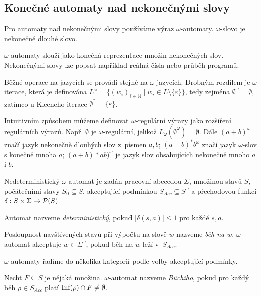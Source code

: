 \subsection{Konečné automaty nad nekonečnými slovy}


Pro automaty nad nekonečnými slovy používáme výraz $\omega$-automaty.
$\omega$-slovo je nekonečně dlouhé slovo.

$\omega$-automaty slouží jako konečná reprezentace množin nekonečných
slov. Nekonečnými slovy lze popsat například reálná čísla nebo průběh
programů.

Běžné operace na jazycích se provádí stejně na $\omega$-jazycích.
Drobným rozdílem je $\omega$ iterace, která je definována
$L^\omega = \{ (w_i)_{i \in \mathbb{N}} \mid w_i \in L \setminus \{ \varepsilon \} \}$,
tedy zejména
$\emptyset^\omega = \emptyset$, zatímco u Kleeneho iterace
$\emptyset^* = \{ \varepsilon \}$.

\begin{example}
    Intuitivním způsobem můžeme definovat
    $\omega$-regulární výrazy jako rozšíření regulárních výrazů.
    Např. $\emptyset$ je $\omega$-regulární, jelikož
    $L_\omega(\emptyset^\omega) = \emptyset$.
    Dále $(a+b)^\omega$ značí jazyk nekonečně dlouhých slov z~písmen
    $a,b$;
    $(a+b)^*b^\omega$ značí jazyk $\omega$-slov s konečně mnoha $a$;
    $(a+b)*ab)^\omega$ je jazyk slov obsahujících nekonečně mnoho $a$ i $b$.
\end{example}

\begin{definition}
    Nedeterministický $\omega$-automat je zadán
    pracovní abecedou $\Sigma$,
    množinou stavů $S$,
    počátečními stavy $S_0 \subseteq S$,
    akceptující podmínkou $S_{Acc} \subseteq S^\omega$
    a přechodovou funkcí $\delta : S \times \Sigma \to \mathcal{P}(S)$.
\end{definition}

Automat nazveme {\em deterministický}, pokud
$\lvert \delta(s,a) \rvert \leq 1$ pro každé $s,a$.

Posloupnost navštívených stavů při výpočtu na slově $w$ nazveme {\em běh
na $w$}.
$\omega$-automat akceptuje $w \in \Sigma^\omega$,
pokud běh na $w$ leží v~$S_{Acc}$.

$\omega$-automaty řadíme do několika kategorií podle volby akceptující
podmínky.

\begin{definition}
    Nechť $F \subseteq S$ je nějaká množina.
    $\omega$-automat nazveme {\em Büchiho},
    pokud pro každý běh $\rho \in S_{Acc}$ platí
    $\text{Inf}(\rho) \cap F \neq \emptyset$.
\end{definition}

